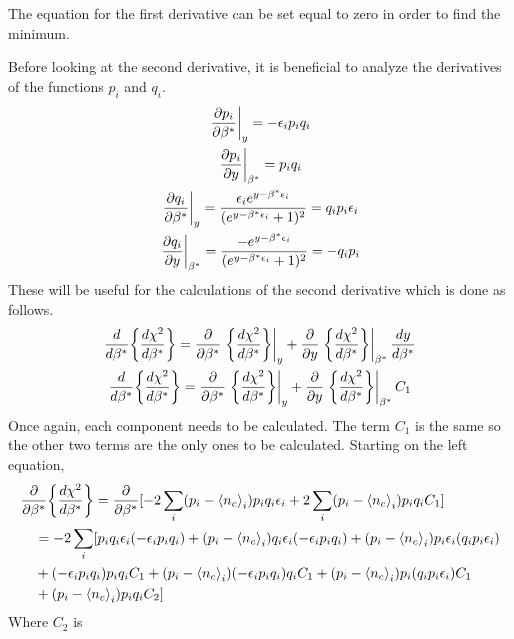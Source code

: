 The equation for the first derivative can be set equal to zero in order to find the minimum.

Before looking at the second derivative, it is beneficial to analyze the derivatives of the functions $p_i$ and $q_i$.
\begin{gather}
    \eval{\frac{\partial p_i}{\partial \beta^*}}_y=-\epsilon_i p_i q_i\\
    \eval{\frac{\partial p_i}{\partial y}}_{\beta^*}=p_i q_i\\
    \eval{\frac{\partial q_i}{\partial \beta^*}}_y=\frac{\epsilon_i e^{y- 
    \beta^* \epsilon_i}}{(e^{y-\beta^* \epsilon_i}+1)^2}=q_i p_i 
    \epsilon_i\\
    \eval{\frac{\partial q_i}{\partial y}}_{\beta^*}=\frac{-e^{y-\beta^* 
    \epsilon_i}}{(e^{y-\beta^* \epsilon_i}+1)^2}=-q_i p_i
\end{gather}
These will be useful for the calculations of the second derivative which is done as follows.  
\begin{gather}
    \frac{d}{d\beta^*} \qty{\frac{d \chi^2}{d\beta^*}} = \frac{\partial } 
    {\partial \beta^*} \eval{\qty{\frac{d \chi^2}{d\beta^*}}}_y+ 
    \frac{\partial }{\partial y} \eval{\qty{\frac{d \chi^2} 
    {d\beta^*}}}_{\beta^*} \frac{dy}{d\beta^*}\nonumber\\
    \frac{d}{d\beta^*} \qty{\frac{d \chi^2}{d\beta^*}} = \frac{\partial } 
    {\partial \beta^*} \eval{\qty{\frac{d \chi^2}{d\beta^*}}}_y+ 
    \frac{\partial }{\partial y} \eval{\qty{\frac{d \chi^2} 
    {d\beta^*}}}_{\beta^*} C_1
\end{gather}
Once again, each component needs to be calculated. The term $C_1$ is the same so the other two terms are the only ones to be calculated. Starting on the left equation,
\begin{align}
&\frac{\partial}{\partial \beta^*} \qty{\frac{d \chi^2}{d \beta^*}} =\frac{\partial}{\partial \beta^*} [-2\sum_i (p_i-\left<{n_c}\right>_i)p_i q_i \epsilon_i+2\sum_i (p_i-\left<{n_c}\right>_i)p_i q_i C_1]\\
    &\quad=-2\sum_i[p_i q_i \epsilon_i (-\epsilon_i p_i q_i) +(p_i-\left<{n_c}\right>_i) q_i \epsilon_i(-\epsilon_i p_i q_i)+ (p_i-\left<{n_c}\right>_i)p_i \epsilon_i(q_i p_i \epsilon_i)\nonumber\\
    &\quad+(-\epsilon_i p_i q_i) p_i q_i C_1+ (p_i-\left<{n_c}\right>_i)(-\epsilon_i p_i q_i) q_i C_1+(p_i-\left<{n_c}\right>_i)p_i(q_i p_i \epsilon_i) C_1\nonumber\\
    &\quad+ (p_i-\left<{n_c}\right>_i) p_i q_i C_2]
\end{align}
Where $C_2$ is
